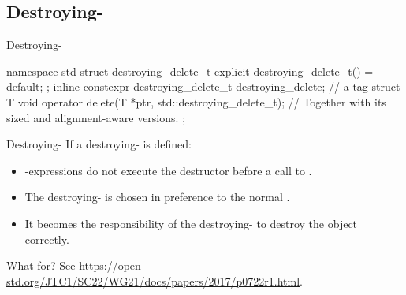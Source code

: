 \documentclass{beamer}
\begin{document}
\subsection{Destroying-}

\begin{frame}[fragile]{Destroying-}
  \begin{cpp}
namespace std {
  struct destroying_delete_t {
    explicit destroying_delete_t() = default;
  };
  inline constexpr destroying_delete_t
      destroying_delete{}; // a tag
}
struct T {
  void operator delete(T *ptr, std::destroying_delete_t);
  // Together with its sized and alignment-aware versions.
};
  \end{cpp}
\end{frame}

\begin{frame}[fragile]{Destroying-}
  If a destroying- is defined:
  \begin{itemize}
    \item {}-expressions do not execute the destructor before a call to .
    \item The destroying- is chosen in preference to the normal .
    \item It becomes the responsibility of the destroying- to destroy the object correctly.
  \end{itemize}
  \pause
  What for? See \url{https://open-std.org/JTC1/SC22/WG21/docs/papers/2017/p0722r1.html}.
\end{frame}
\end{document}
